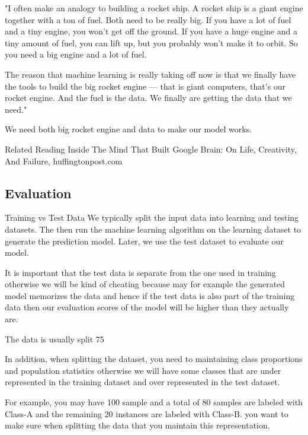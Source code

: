 "I often make an analogy to building a rocket ship. A rocket ship is a giant engine together with a ton of fuel. Both need to be really big. If you have a lot of fuel and a tiny engine, you won’t get off the ground. If you have a huge engine and a tiny amount of fuel, you can lift up, but you probably won’t make it to orbit. So you need a big engine and a lot of fuel.

The reason that machine learning is really taking off now is that we finally have the tools to build the big rocket engine — that is giant computers, that’s our rocket engine. And the fuel is the data. We finally are getting the data that we need."

We need both big rocket engine and data to make our model works.

Related Reading
Inside The Mind That Built Google Brain: On Life, Creativity, And Failure, huffingtonpost.com

\subsection{Evaluation}

Training vs Test Data
We typically split the input data into learning and testing datasets. The then run the machine learning algorithm on the learning dataset to generate the prediction model. Later, we use the test dataset to evaluate our model.


It is important that the test data is separate from the one used in training otherwise we will be kind of cheating because may for example the generated model memorizes the data and hence if the test data is also part of the training data then our evaluation scores of the model will be higher than they actually are.

The data is usually split 75%

In addition, when splitting the dataset, you need to maintaining class proportions and population statistics otherwise we will have some classes that are under represented in the training dataset and over represented in the test dataset.

For example, you may have 100 sample and a total of 80 samples are labeled with Class-A and the remaining 20 instances are labeled with Class-B. you want to make sure when splitting the data that you maintain this representation.

